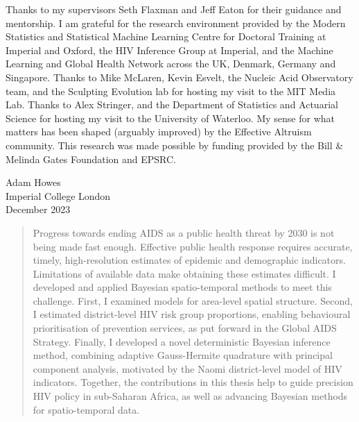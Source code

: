 \documentclass[a4paper, nobind]{templates/ociamthesis}
\begin{document}
\begin{romanpages}
\begin{acknowledgements}
 	Thanks to my supervisors Seth Flaxman and Jeff Eaton for their guidance and mentorship.
 I am grateful for the research environment provided by the Modern Statistics and Statistical Machine Learning Centre for Doctoral Training at Imperial and Oxford, the HIV Inference Group at Imperial, and the Machine Learning and Global Health Network across the UK, Denmark, Germany and Singapore.
 Thanks to Mike McLaren, Kevin Esvelt, the Nucleic Acid Observatory team, and the Sculpting Evolution lab for hosting my visit to the MIT Media Lab.
 Thanks to Alex Stringer, and the Department of Statistics and Actuarial Science for hosting my visit to the University of Waterloo.
 My sense for what matters has been shaped (arguably improved) by the Effective Altruism community.
 This research was made possible by funding provided by the Bill \& Melinda Gates Foundation and EPSRC.

 \begin{flushright}
 Adam Howes \\
 Imperial College London\\
 December 2023
 \end{flushright}
\end{acknowledgements}

\begin{abstract}
	Progress towards ending AIDS as a public health threat by 2030 is not being made fast enough.
Effective public health response requires accurate, timely, high-resolution estimates of epidemic and demographic indicators.
Limitations of available data make obtaining these estimates difficult.
I developed and applied Bayesian spatio-temporal methods to meet this challenge.
First, I examined models for area-level spatial structure.
Second, I estimated district-level HIV risk group proportions, enabling behavioural prioritisation of prevention services, as put forward in the Global AIDS Strategy.
Finally, I developed a novel deterministic Bayesian inference method, combining adaptive Gauss-Hermite quadrature with principal component analysis, motivated by the Naomi district-level model of HIV indicators.
Together, the contributions in this thesis help to guide precision HIV policy in sub-Saharan Africa, as well as advancing Bayesian methods for spatio-temporal data.
\end{abstract}


\end{romanpages}
\end{document}
